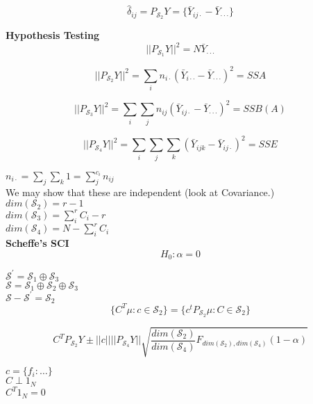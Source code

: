 \documentclass[11pt,fleqn]{book} %
\begin{document}
		$$\hat{\delta}_{ij} =P _{\mathcal{S}_2} Y =  \{\bar{Y}_{i j \cdot} - \bar{Y}_{\cdot \cdot \cdot} \} $$

\textbf{Hypothesis Testing}\\

		$$||P _{\mathcal{S}_1} Y ||^2 = N  \bar{Y}_{\cdot \cdot \cdot}  $$

		$$||P _{\mathcal{S}_2} Y ||^2 = \sum_i n_{i \cdot} (\bar{Y}_{i \cdot \cdot} - \bar{Y}_{\cdot \cdot \cdot})^2   = SSA $$

		$$||P _{\mathcal{S}_3} Y ||^2 = \sum_i \sum_j n_{ij} (\bar{Y}_{i j \cdot} - \bar{Y}_{\cdot \cdot \cdot})^2  = SSB(A) $$

		$$||P _{\mathcal{S}_4} Y ||^2 = \sum_i \sum_j \sum_k (\bar{Y}_{i j k} - \bar{Y}_{i j \cdot})^2  = SSE $$


$n_{i\cdot} = \sum_j \sum_k 1 = \sum_j^{c_i} n_{ij}$\\

We may show that these are independent (look at Covariance.)\\

$dim(\mathcal{S}_2) = r - 1$\\

$dim(\mathcal{S}_3) = \sum_i^r C_i - r$\\

$dim(\mathcal{S}_4) = N -  \sum_i^r C_i $\\


\textbf{Scheffe's SCI}\\


		$$ H_0: \alpha = 0 $$

$\mathcal{S}^\prime = \mathcal{S}_1 \oplus \mathcal{S}_3$\\
$\mathcal{S} = \mathcal{S}_1 \oplus \mathcal{S}_2 \oplus \mathcal{S}_3$\\

$\mathcal{S} - \mathcal{S}^\prime = \mathcal{S}_2$\\


		$$\{C^T \mu: c \in \mathcal{S}_2\} = \{c^t P_{\mathcal{S}_2} \mu: C \in \mathcal{S}_2 \} $$

		$$C^T P_{\mathcal{S}_2} Y \pm ||c|| ||P_{\mathcal{S}_4} Y|| \sqrt{\frac{dim(\mathcal{S}_2)}{dim(\mathcal{S}_4)} F_{dim(\mathcal{S}_2), dim(\mathcal{S}_4)} (1 - \alpha)} $$


$c = \{f_i: \dots \}$\\

$C \perp 1_N$\\

$C^T 1_N = 0$\\
\end{document}
